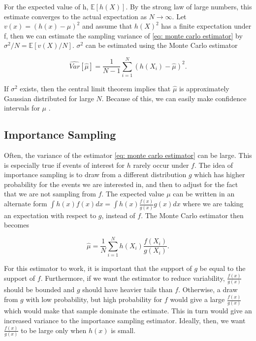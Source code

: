For the expected value of h, $\mathbb{E}[h(X)]$. By the strong law of large numbers, this estimate converges to the actual expectation as $N\rightarrow\infty$. Let $v(x) = (h(x) - {\mu})^2$ and assume that $h(X)^2$ has a finite expectation under f, then we can estimate the sampling variance of \eqref{eq: monte carlo estimator} by $\sigma^2/N = \mathbb{E}[v(X)/N]$. $\sigma^2$ can be estimated using the Monte Carlo estimator

$$
    \widehat{Var}[\hat{\mu}] = \frac{1}{N-1}\sum_{i=1}^N (h(X_i) - \hat{\mu})^2.
$$

If $\sigma^2$ exists, then the central limit theorem implies that $\hat{\mu}$ is approximately Gaussian distributed for large $N$. Because of this, we can easily make confidence intervals for $\mu$ \parencite{givens2013computational}.


\subsection{Importance Sampling}
\label{subsec: importance sampling theory}
Often, the variance of the estimator \eqref{eq: monte carlo estimator} can be large. This is especially true if events of interest for $h$ rarely occur under $f$. The idea of importance sampling is to draw from a different distribution $g$ which has higher probability for the events we are interested in, and then to adjust for the fact that we are not sampling from $f$. The expected value $\mu$ can be written in an alternate form $\int h(x)f(x)dx = \int h(x)\frac{f(x)}{g(x)}g(x) dx$ where we are taking an expectation with respect to $g$, instead of $f$. The Monte Carlo estimator then becomes

\begin{equation}
    \hat{\mu} = \frac{1}{N} \sum_{i=1}^N h(X_i)\frac{f(X_i)}{g(X_i)}.
\end{equation}

For this estimator to work, it is important that the support of $g$ be equal to the support of $f$. Furthermore, if we want the estimator to reduce variability, $\frac{f(x)}{g(x)}$ should be bounded and $g$ should have heavier tails than $f$. Otherwise, a draw from $g$ with low probability, but high probability for $f$ would give a large $\frac{f(x)}{g(x)}$ which would make that sample dominate the estimate. This in turn would give an increased variance to the importance sampling estimator. Ideally, then, we want $\frac{f(x)}{g(x)}$ to be large only when $h(x)$ is small. \parencite{givens2013computational}






